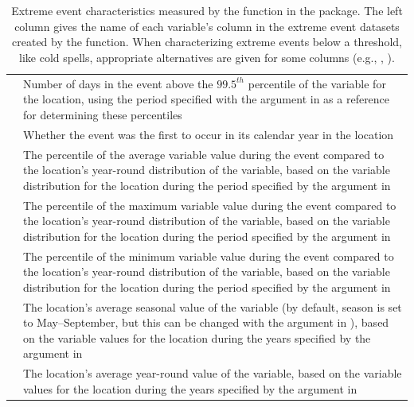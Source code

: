 \begin{table}
\begin{tabular}{lL{\tabcolsep\relax}}
 & Number of days in the event above the $99.5^{th}$ percentile of the variable for the location, using the period specified with the  argument in  as a reference for determining these percentiles \\
 & Whether the event was the first to occur in its calendar year in the location \\
 & The percentile of the average variable value during the event compared to the location's year-round distribution of the variable, based on the variable distribution for the location during the period specified by the  argument in  \\
 & The percentile of the maximum variable value during the event compared to the location's year-round distribution of the variable, based on the variable distribution for the location during the period specified by the  argument in  \\
 & The percentile of the minimum variable value during the event compared to the location's year-round distribution of the variable, based on the variable distribution for the location during the period specified by the  argument in  \\
 & The location's average seasonal value of the variable (by default, season is set to May--September, but this can be changed with the  argument in ), based on the variable values for the location during the years specified by the  argument in  \\
 & The location's average year-round value of the variable, based on the variable values for the location during the years specified by the  argument in  \\
\bottomrule
\end{tabular}
\caption{Extreme event characteristics measured by the  function in the  package. The left column gives the name of each variable's column in the extreme event datasets created by the  function. When characterizing extreme events below a threshold, like cold spells, appropriate alternatives are given for some columns (e.g., , ).}
\label{tab:hwcharacteristics}
\end{table}

